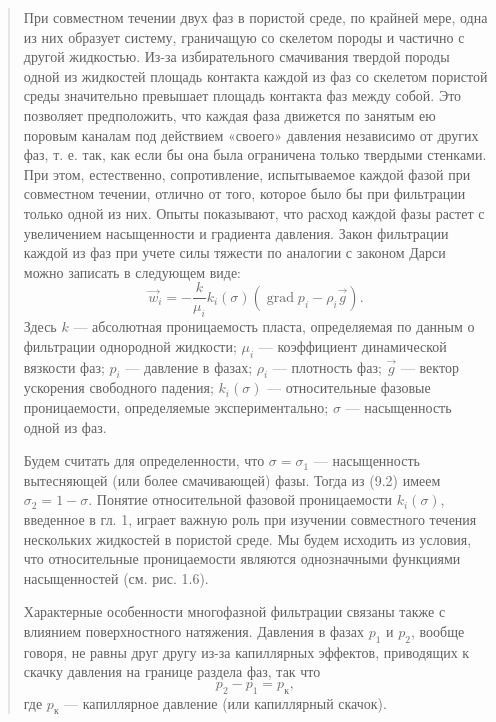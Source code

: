 \documentclass[12pt,a4paper]{article}
\DeclareMathOperator{\grad}{grad}
\begin{document}
\begin{quote}\sloppy
При совместном течении двух фаз в пористой среде, по крайней мере, одна из них образует систему, граничащую со скелетом породы и частично с другой жидкостью. Из-за избирательного смачивания твердой породы одной из жидкостей площадь контакта каждой из фаз со скелетом пористой среды значительно превышает площадь контакта фаз между собой. Это позволяет предположить, что каждая фаза движется по занятым ею поровым каналам под действием «своего» давления независимо от других фаз, т. е. так, как если бы она была ограничена только твердыми стенками. При этом, естественно, сопротивление, испытываемое каждой фазой при совместном течении, отлично от того, которое было бы при фильтрации только одной из них. Опыты показывают, что расход каждой фазы растет с увеличением насыщенности и градиента давления. Закон фильтрации каждой из фаз при учете силы тяжести по аналогии с законом Дарси можно записать в следующем виде:
\begin{equation}\vec w_i=-\frac{k}{\mu_i}k_i(\sigma)(\grad p_i-\rho_i\vec g).\tag{9.4}\label{q10:eq-9-4}\end{equation}
Здесь $k$ --- абсолютная проницаемость пласта, определяемая по данным о фильтрации однородной жидкости; $\mu_i$ --- коэффициент динамической вязкости фаз; $p_i$ --- давление в фазах; $\rho_i$ --- плотность фаз; $\vec g$ --- вектор ускорения свободного падения; $k_i(\sigma)$ --- относительные фазовые проницаемости, определяемые экспериментально; $\sigma$ --- насыщенность одной из фаз.

Будем считать для определенности, что $\sigma=\sigma_1$ --- насыщенность вытесняющей (или более смачивающей) фазы. Тогда из (9.2) имеем $\sigma_2=1-\sigma$. Понятие относительной фазовой проницаемости $k_i(\sigma)$, введенное в гл. 1, играет важную роль при изучении совместного течения нескольких жидкостей в пористой среде. Мы будем исходить из условия, что относительные проницаемости являются однозначными функциями насыщенностей (см. рис. 1.6).

Характерные особенности многофазной фильтрации связаны также с влиянием поверхностного натяжения. Давления в фазах $p_1$ и $p_2$, вообще говоря, не равны друг другу из-за капиллярных эффектов, приводящих к скачку давления на границе раздела фаз, так что
\begin{equation}p_2-p_1=p_\text{к},\tag{9.5}\label{q10:eq-9-5}\end{equation}
где $p_\text{к}$ --- капиллярное давление (или капиллярный скачок).


\end{quote}
\end{document}
